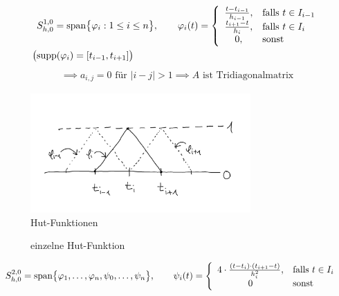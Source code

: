 \begin{align*}
	&S^{1,0}_{h,0}=\text{span}\big\lbrace\varphi_i:1\leq i\leq n\big\rbrace,\qquad
\varphi_i(t)=\left\lbrace\begin{array}{cl}
\frac{t-t_{i-1}}{h_{i-1}}, &\text{falls } t\in I_{i-1}\\
\frac{t_{i+1}-t}{h_i}, &\text{falls } t\in I_i\\
0, &\text{sonst }
\end{array}\right.\\
\big(&\text{supp}(\varphi_i) = [t_{i-1}, t_{i+1}]\big)
\end{align*}
\begin{align*}
\implies a_{i,j}=0\text{ für }|i-j|>1\implies A\text{ ist Tridiagonalmatrix}
\end{align*}

\begin{figure}[h!]
	\begin{center}
		\includegraphics[width=0.75\textwidth]{pics/Sketch1.png}
		\caption{Hut-Funktionen}
		\label{AbbHutFunktionen}
	\end{center}
\end{figure}

\begin{figure}[h!]
\begin{center}

\caption{einzelne Hut-Funktion}
\label{AbbPhiHat}
\end{center}
\end{figure}

\begin{align*}
S_{h,0}^{2,0}&=\text{span}\big\lbrace\varphi_1,\ldots,\varphi_n,\psi_0,\ldots,\psi_n\big\rbrace,\qquad
\psi_i(t)=\left\lbrace\begin{array}{cl}
4\cdot\frac{(t-t_i)\cdot(t_{i+1}-t)}{h_i^2}, &\text{falls } t\in I_i\\
0 &\text{sonst }
\end{array}\right.
\end{align*}

